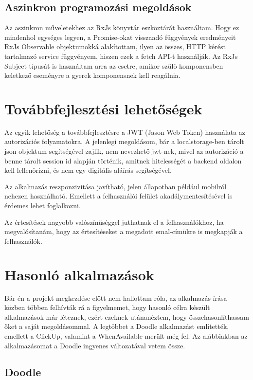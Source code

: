 \documentclass[a4paper,12pt]{report}
\theoremstyle{definition}
\theoremstyle{remark}
\begin{document}
\section{Aszinkron programozási megoldások}

Az aszinkron műveletekhez az RxJs könyvtár eszköztárát használtam. Hogy ez mindenhol egységes legyen, a Promise-okat visszaadó függvények eredményeit RxJs Observable objektumokká alakítottam, ilyen az összes, HTTP kérést tartalmazó service függvényem, hiszen ezek a fetch API-t használják. Az RxJs Subject típusát is használtam arra az esetre, amikor szülő komponensben keletkező eseményre a gyerek komponensnek kell reagálnia.
 
\chapter{Továbbfejlesztési lehetőségek}

Az egyik lehetőség a továbbfejlesztésre a JWT (Jason Web Token) használata az autorizációs folyamatokra. A jelenlegi megoldásom, bár a localstorage-ben tárolt json objektum segítségével zajlik, nem nevezhető jwt-nek, mivel az autorizáció a benne tárolt session id alapján történik, amitnek hitelességét a backend oldalon kell lellenőrizni, és nem egy digitális aláírás segítségével.

Az alkalmazás reszponzivitása javítható, jelen állapotban például mobilról nehezen használható. Emellett a felhasználói felület akadálymentesítésével is érdemes lehet foglalkozni.

Az értesítések nagyobb valószínűséggel juthatnak el a felhasználókhoz, ha megvalósítanám, hogy az értesítéseket a megadott emal-címükre is megkapják a felhasználók.

\chapter{Hasonló alkalmazások}

Bár én a projekt megkezdése előtt nem hallottam róla, az alkalmazás írása közben többen felhívták rá a figyelmemet, hogy hasonló célra készült alkalmazások már léteznek, ezért ezeknek utánanéztem, hogy összehasonlíthassam őket a saját megoldásommal. A legtöbbet a Doodle alkalmazást említették, emellett a ClickUp, valamint a WhenAvailable merült még fel. Az alábbiakban az alkalmazásomat a Doodle ingyenes változatával vetem össze.

\section{Doodle}
\end{document}

